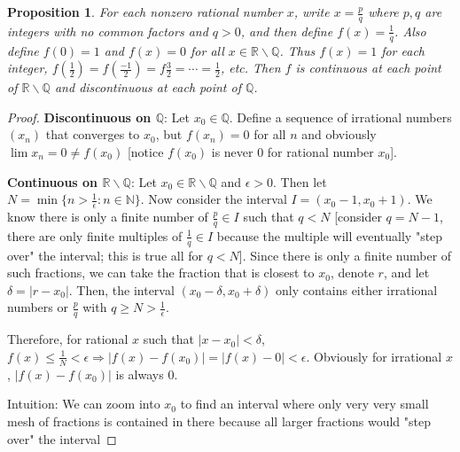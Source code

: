 \documentclass{article}
\newtheorem{proposition}[thm]{Proposition}
\begin{document}
\begin{proposition}
    For each nonzero rational number $x$, write $x = \frac{p}{q}$ where $p,q$ are integers with 
    no common factors and $q>0$, and then define $f(x)=\frac{1}{q}$. Also define $f(0)=1$ and 
    $f(x)=0$ for all $x\in\mathbb{R}\backslash\mathbb{Q}$. Thus $f(x)=1$ for each integer, 
    $f(\frac{1}{2})=f(\frac{-1}{2})=f\frac{3}{2}=\cdots=\frac{1}{2}$, etc. Then $f$ is continuous 
    at each point of $\mathbb{R}\backslash\mathbb{Q}$ and discontinuous at each point of 
    $\mathbb{Q}$.
\end{proposition}
\begin{proof}
    \textbf{Discontinuous on $\mathbb{Q}$}: Let $x_0\in\mathbb{Q}$. Define a sequence of irrational 
    numbers $(x_n)$ that converges to $x_0$, but $f(x_n)=0$ for all $n$ and obviously $\lim x_n=0\neq
    f(x_0)$ [notice $f(x_0)$ is never 0 for rational number $x_0$].

    \textbf{Continuous on $\mathbb{R}\backslash\mathbb{Q}$}: Let $x_0\in\mathbb{R}\backslash
    \mathbb{Q}$ and $\epsilon>0$. Then let $N=\min\{n>\frac{1}{\epsilon}:n\in\mathbb{N}\}$. 
    Now consider the interval $I = (x_0-1, x_0+1)$. We know there is only a finite number of 
    $\frac{p}{q}\in I$ such that $q<N$ [consider $q=N-1$, there are only finite multiples of 
    $\frac{1}{q}\in I$ because the multiple will eventually "step over" the interval; this is true 
    all for $q<N$]. Since there is only a finite number of such fractions, we can take the fraction 
    that is closest to $x_0$, denote $r$, and let $\delta = |r-x_0|$. Then, the interval 
    $(x_0-\delta,x_0+\delta)$ only contains either irrational numbers or $\frac{p}{q}$ with 
    $q\ge N>\frac{1}{\epsilon}$. 

    Therefore, for rational $x$ such that $|x-x_0|<\delta$, $f(x)\le \frac{1}{N} < \epsilon\Rightarrow
    |f(x)-f(x_0)|=|f(x)-0|<\epsilon$. Obviously for irrational $x$, $|f(x)-f(x_0)|$ is always 0.

    Intuition: We can zoom into $x_0$ to find an interval where only very very small mesh of 
    fractions is contained in there because all larger fractions would "step over" the interval
\end{proof}
\end{document}
